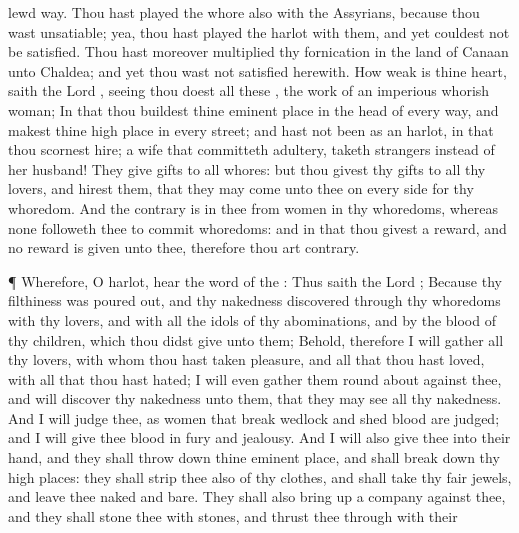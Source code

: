 {lewd
way.
Thou hast played the
whore also with the
Assyrians,
because thou wast
unsatiable; yea, thou hast played the
harlot with them, and yet couldest not be
satisfied.
Thou hast moreover
multiplied thy
fornication in the
land of
Canaan unto
Chaldea; and yet thou wast not
satisfied
herewith.
How
weak is thine
heart,
saith the
Lord
{}, seeing thou
doest all these
{}, the
work of an
imperious
whorish
woman;
In that thou
buildest thine eminent
place in the
head of every
way, and
makest thine high
place in every
street; and hast not been as an
harlot, in that thou
scornest
hire;
 a
wife that committeth
adultery,
{}
taketh
strangers instead of her
husband!
They
give
gifts to all
whores: but thou
givest thy
gifts to all thy
lovers, and
hirest them, that they may
come unto thee on every
side for thy
whoredom.
And the
contrary is in thee from
{}
women in thy
whoredoms, whereas none
followeth thee to commit
whoredoms: and in that thou
givest a
reward, and no
reward is
given unto thee, therefore thou
art
contrary.
\par }{\PP {}¶ Wherefore, O
harlot,
hear the
word of the
{}:
Thus
saith the
Lord
{}; Because thy
filthiness was poured
out, and thy
nakedness
discovered through thy
whoredoms with thy
lovers, and with all the
idols of thy
abominations, and by the
blood of thy
children, which thou didst
give unto them;
Behold, therefore I will
gather all thy
lovers, with whom thou hast taken
pleasure, and all
{} that thou hast
loved, with all
{} that thou hast
hated; I will even
gather them round
about against thee, and will
discover thy
nakedness unto them, that they may
see all thy
nakedness.
And I will
judge thee, as women that break
wedlock and
shed
blood are
judged; and I will
give thee
blood in
fury and
jealousy.
And I will also
give thee into their
hand, and they shall throw
down thine eminent
place, and shall break
down thy high
places: they shall
strip thee also of thy
clothes, and shall
take thy
fair
jewels, and
leave thee
naked and
bare.
They shall also bring
up a
company against thee, and they shall
stone thee with
stones, and thrust thee
through with their
}
